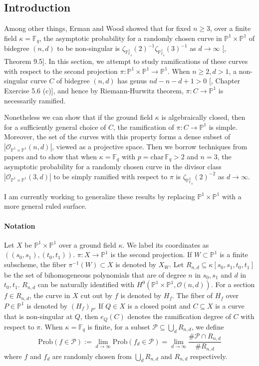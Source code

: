 \documentclass[12pt]{article}
\theoremstyle{plain}
\theoremstyle{definition}
\newcommand{\IF}{\mathbb{F}}
\newcommand{\IP}{\mathbb{P}}
\newcommand{\sO}{\mathcal{O}}
\newcommand{\sP}{\mathcal{P}}
\newcommand\union{\bigcup}
\newcommand{\<}{\langle}
\renewcommand{\>}{\rangle}
\newcommand{\Prob}{\mathrm{Prob}}
\begin{document}
\subsection{Introduction}
Among other things, Erman and Wood showed that for fixed $n \ge 3$, over a finite field $\kappa = \IF_q$, the asymptotic probability for a randomly chosen curve in $\IP^1 \times \IP^1$ of bidegree $(n, d)$ to be non-singular is $\zeta_{\IP^1_{\IF_q}}(2)^{-1}\zeta_{\IP^1_{\IF_q}}(3)^{-1}$ as $d \to \infty$ [\cite{Wood}, Theorem 9.5].
In this section, we attempt to study ramifications of these curves with respect to the second projection $\pi: \IP^1 \times \IP^1 \to \IP^1$. When $n \ge 2, d > 1$, a non-singular curve $C$ of bidegree $(n, d)$ has genus $nd - n - d + 1 >  0$ [\cite{Hartshorne}, Chapter \uppercase\expandafter{} Exercise 5.6 (c)], and hence by Riemann-Hurwitz theorem, $\pi : C \to \IP^1$ is necessarily ramified. 

Nonetheless we can show that if the ground field $\kappa$ is algebraically closed, then for a sufficiently general choice of $C$, the ramification of $\pi : C \to \IP^1$ is simple. Moreover, the set of the curves with this property forms a dense subset of $|\sO_{\IP^1 \times \IP^1}(n, d)|$, viewed as a projective space. Then we borrow techniques from papers \cite{Poonen} and \cite{Wood} to show that when $\kappa = \IF_q$ with $p = \mathrm{char}\, \IF_q > 2$ and $n = 3$, the asymptotic probability for a randomly chosen curve in the divisor class $|\sO_{\IP^1 \times \IP^1}(3, d)|$ to be simply ramified with respect to $\pi$ is $\zeta_{\IP^1_{\IF_q}}(2)^{-2}$ as $d \to \infty$. 

I am currently working to generalize these results by replacing $\IP^1 \times \IP^1$ with a more general ruled surface.   


\paragraph{Notation} 
Let $X$ be $\IP^1 \times \IP^1$ over a ground field $\kappa$. We label its coordinates as $((s_0, s_1), (t_0, t_1))$. $\pi : X \to \IP^1$ is the second projection. If $W \subset \IP^1$ is a finite subscheme, the fiber $\pi^{-1}(W) \subset X$ is denoted by $X_W$. Let $R_{n, d} \subseteq \kappa[s_0, s_1, t_0, t_1]$ be the set of bihomogeneous polynomials that are of degree $n$ in $s_0, s_1$ and $d$ in $t_0, t_1$. $R_{n, d}$ can be naturally identified with $H^0(\IP^1 \times \IP^1, \sO(n, d))$. For a section $f \in R_{n, d}$, the curve in $X$ cut out by $f$ is denoted by $H_f$. The fiber of $H_f$ over $P \in \IP^1$ is denoted by $(H_f)_P$. If $Q \in X$ is a closed point and $C \subseteq X$ is a curve that is non-singular at $Q$, then $e_Q(C)$ denotes the ramification degree of $C$ with respect to $\pi$. When $\kappa = \IF_q$ is finite, for a subset $\sP \subseteq \union_d R_{n, d}$, we define 
$$ \Prob(f \in \sP) := \lim_{d \to \infty}\Prob(f_d \in \sP) = \lim_{d \to \infty} \frac{\# \sP \cap R_{n, d}}{\# R_{n, d}}$$
where $f$ and $f_d$ are randomly chosen from $\union_{d} R_{n, d}$ and $R_{n, d}$ respectively. 
\end{document}
